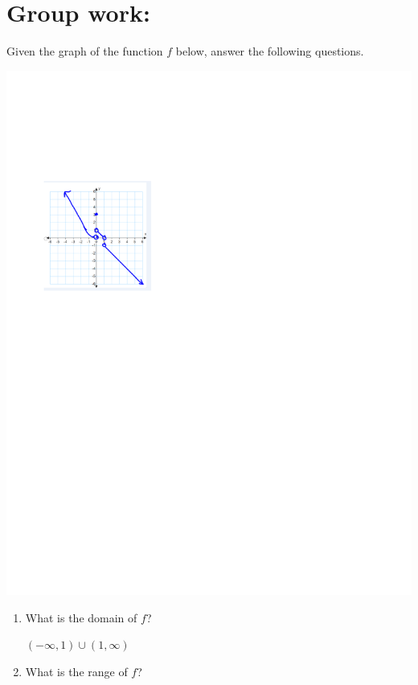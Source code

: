 \documentclass[nooutcomes]{ximera}
\begin{document}
\section*{Group work:}
	\begin{problem}
	 	Given the graph of the function $f$ below, answer the following questions.
			
\begin{image}		
\includegraphics[trim= 80 460 300 170]{Figure3.pdf}
\end{image}	

		\begin{enumerate}
		
			 \item What is the domain of $f$?
			 
			 \begin{freeResponse}			 
			 $(-\infty, 1) \cup (1, \infty)$
			\end{freeResponse}
			 
			 \item What is the range of $f$?
			 

\end{enumerate}
\end{problem}
\end{document}
